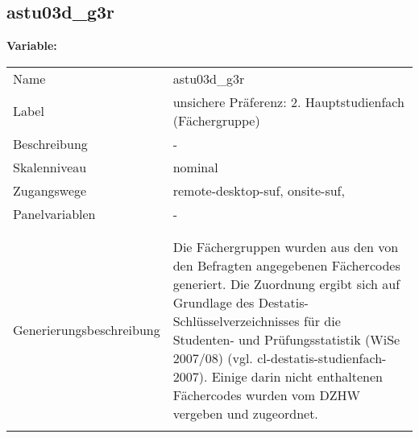 	
	
	\subsection{astu03d\_g3r}
	\label{subSection:astu03d_g3r}

	\noindent\textbf{Variable:}\\
		\begin{tabular}{lL{11.3cm}}
			\label{tableVariable:astu03d_g3r}
			Name & astu03d\_g3r \\
			Label & unsichere Präferenz: 2. Hauptstudienfach  (Fächergruppe) \\
			Beschreibung & - \\
			Skalenniveau & nominal \\
			Zugangswege &
				remote-desktop-suf,
				onsite-suf,
 \\
			Panelvariablen & -
			 \\
			 \\
 \\
					Generierungsbeschreibung & Die Fächergruppen wurden aus den von den Befragten angegebenen Fächercodes generiert. Die Zuordnung ergibt sich auf Grundlage des Destatis-Schlüsselverzeichnisses für die Studenten- und Prüfungsstatistik (WiSe 2007/08) (vgl. cl-destatis-studienfach-2007).  Einige darin nicht enthaltenen Fächercodes wurden vom DZHW vergeben und zugeordnet. 
				 \\	
			 \\
		\end{tabular}






